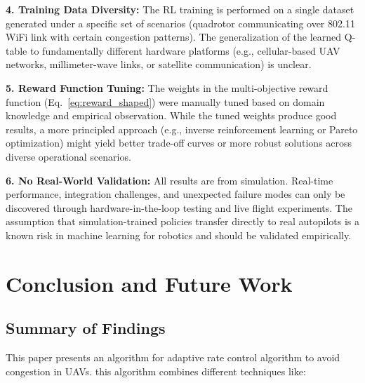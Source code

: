 \documentclass[pdflatex,sn-mathphys-num]{sn-jnl}%
\theoremstyle{thmstyleone}%
\theoremstyle{thmstyletwo}%
\theoremstyle{thmstylethree}%
\begin{document}
\textbf{4. Training Data Diversity:} The RL training is performed on a single dataset generated under a specific set of scenarios (quadrotor communicating over 802.11 WiFi link with certain congestion patterns). The generalization of the learned Q-table to fundamentally different hardware platforms (e.g., cellular-based UAV networks, millimeter-wave links, or satellite communication) is unclear.

\textbf{5. Reward Function Tuning:} The weights in the multi-objective reward function (Eq.~\ref{eq:reward_shaped}) were manually tuned based on domain knowledge and empirical observation. While the tuned weights produce good results, a more principled approach (e.g., inverse reinforcement learning or Pareto optimization) might yield better trade-off curves or more robust solutions across diverse operational scenarios.

\textbf{6. No Real-World Validation:} All results are from simulation. Real-time performance, integration challenges, and unexpected failure modes can only be discovered through hardware-in-the-loop testing and live flight experiments. The assumption that simulation-trained policies transfer directly to real autopilots is a known risk in machine learning for robotics and should be validated empirically.

\section{ Conclusion and Future Work }

\subsection{ Summary of Findings }


This paper presents an algorithm for adaptive rate control algorithm to avoid congestion in UAVs. this algorithm combines different techniques like: 
\end{document}
